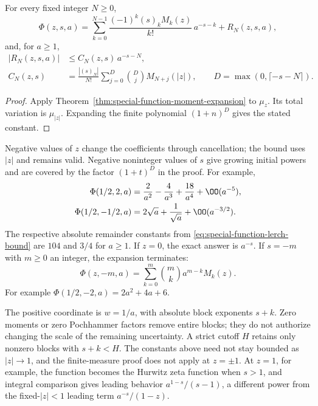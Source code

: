 \begin{corollary}
\label{cor:special-function-lerch}
For every fixed integer $N\ge0$,
\begin{equation}
 \Phi(z,s,a)=\sum_{k=0}^{N-1}
       \frac{(-1)^k(s)_k M_k(z)}{k!}\,a^{-s-k}
              +R_N(z,s,a),
 \label{eq:special-function-lerch-expansion}
\end{equation}
and, for $a\ge1$,
\begin{equation}
\begin{aligned}
 |R_N(z,s,a)|&\le C_N(z,s)\,a^{-s-N},\\
 C_N(z,s)&=\frac{|(s)_N|}{N!}
       \sum_{j=0}^{D}\binom Dj M_{N+j}(|z|),
 \qquad D=\max(0,\lceil-s-N\rceil).
\end{aligned}
\label{eq:special-function-lerch-bound}
\end{equation}
\end{corollary}
\begin{proof}
Apply Theorem~\ref{thm:special-function-moment-expansion} to $\mu_z$.
Its total variation is $\mu_{|z|}$. Expanding the finite polynomial
$(1+n)^D$ gives the stated constant.
\end{proof}

Negative values of $z$ change the coefficients through cancellation;
the bound uses $|z|$ and remains valid. Negative noninteger values of
$s$ give growing initial powers and are covered by the factor
$(1+t)^D$ in the proof. For example,
\begin{equation}
\begin{aligned}
 \Phi(1/2,2,a)
   &=\frac2{a^2}-\frac4{a^3}+\frac{18}{a^4}
                   +\OO(a^{-5}),\\
 \Phi(1/2,-1/2,a)
   &=2\sqrt a+\frac1{\sqrt a}+\OO(a^{-3/2}).
\end{aligned}
\label{eq:special-function-lerch-examples}
\end{equation}
The respective absolute remainder constants from
\eqref{eq:special-function-lerch-bound} are $104$ and $3/4$ for
$a\ge1$. If $z=0$, the exact answer is $a^{-s}$. If $s=-m$ with
$m\ge0$ an integer, the expansion terminates:
\[
 \Phi(z,-m,a)=\sum_{k=0}^m\binom mk a^{m-k}M_k(z).
\]
For example $\Phi(1/2,-2,a)=2a^2+4a+6$.

The positive coordinate is $w=1/a$, with absolute block exponents
$s+k$. Zero moments or zero Pochhammer factors remove entire blocks;
they do not authorize changing the scale of the remaining uncertainty.
A strict cutoff $H$ retains only nonzero blocks with $s+k<H$.
The constants above need not stay bounded as $|z|\to1$, and the
finite-measure proof does not apply at $z=\pm1$. At $z=1$, for example,
the function becomes the Hurwitz zeta function when $s>1$, and integral
comparison gives leading behavior $a^{1-s}/(s-1)$, a different power
from the fixed-$|z|<1$ leading term $a^{-s}/(1-z)$.

